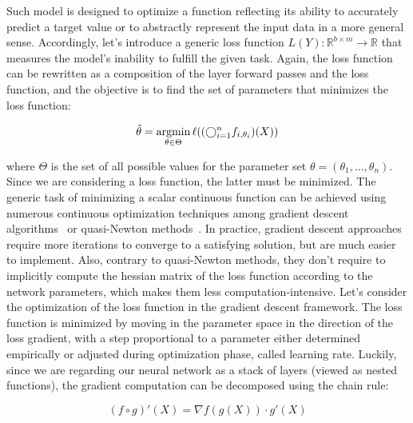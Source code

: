         Such model is designed to optimize a function reflecting its ability to accurately predict a target value or to abstractly represent the input
        data in a more general sense. Accordingly, let's introduce a generic loss function $L(Y): \mathbb{R}^{b \times m} \rightarrow \mathbb{R}$ that measures
        the model's inability to fulfill the given task. Again, the loss function can be rewritten as a composition of the layer forward passes and the loss  %
        function, and the objective is to find the set of parameters that minimizes the loss function:

        \begin{equation}
            \hat{\theta} = \argmin_{\theta \in \Theta} \ell((\bigcirc_{i=1}^{n} f_{i, \theta_i})(X))  %
        \end{equation}

        where $\Theta$ is the set of all possible values for the parameter set $\theta = (\theta_1, \ldots, \theta_n)$.
        Since we are considering a loss function, the latter must be minimized.
        The generic task of minimizing a scalar continuous function can be achieved
        using numerous continuous optimization techniques  among gradient descent algorithms~\cite{DBLP:journals/corr/Ruder16}
        or quasi-Newton methods~\cite{LBFGS}. In practice, gradient descent approaches require more iterations to converge to a satisfying solution,  %
        but are much easier to implement. Also, contrary to quasi-Newton methods, they don't require to implicitly compute the hessian matrix of the loss
        function according to the network parameters, which makes them less computation-intensive. Let's consider the optimization of the loss function
        in the gradient descent framework. The loss function is minimized by moving in the parameter space in the direction of the loss gradient, with
        a step proportional to a parameter either determined empirically or adjusted during optimization phase, called learning rate.
        Luckily, since we are regarding our neural network as a stack of layers (viewed as nested functions), the gradient computation can be decomposed  %
        using the chain rule:

        \begin{equation} \label{eq:backprop}  %
            (f \circ g)'(X) = \nabla f(g(X)) \cdot g'(X)
        \end{equation}

